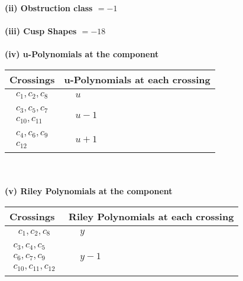 \documentclass[1p]{elsarticle_modified}
\theoremstyle{definition}
\begin{document}
\flushleft \textbf{(ii) Obstruction class $= -1$}\\~\\
\flushleft \textbf{(iii) Cusp Shapes $= -18$}\\~\\
\newpage\renewcommand{\arraystretch}{1}
\flushleft \textbf{(iv) u-Polynomials at the component}\newline \\
\begin{tabular}{m{50pt}|m{274pt}}
Crossings & \hspace{64pt}u-Polynomials at each crossing \\
\hline $$\begin{aligned}c_{1},c_{2},c_{8}\end{aligned}$$&$\begin{aligned}
&u
\end{aligned}$\\
\hline $$\begin{aligned}c_{3},c_{5},c_{7}\\c_{10},c_{11}\end{aligned}$$&$\begin{aligned}
&u-1
\end{aligned}$\\
\hline $$\begin{aligned}c_{4},c_{6},c_{9}\\c_{12}\end{aligned}$$&$\begin{aligned}
&u+1
\end{aligned}$\\
\hline
\end{tabular}\\~\\
\newpage\renewcommand{\arraystretch}{1}
\flushleft \textbf{(v) Riley Polynomials at the component}\newline \\
\begin{tabular}{m{50pt}|m{274pt}}
Crossings & \hspace{64pt}Riley Polynomials at each crossing \\
\hline $$\begin{aligned}c_{1},c_{2},c_{8}\end{aligned}$$&$\begin{aligned}
&y
\end{aligned}$\\
\hline $$\begin{aligned}c_{3},c_{4},c_{5}\\c_{6},c_{7},c_{9}\\c_{10},c_{11},c_{12}\end{aligned}$$&$\begin{aligned}
&y-1
\end{aligned}$\\
\hline
\end{tabular}\\~\\
\end{document}
